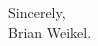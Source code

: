 \begin{comment}
\vspace{2.0ex}

I would enjoy discussing this position with you in the weeks to come. In the meantime, I am enclosing my curriculum vitae and list of courses taught.  If you require any additional materials or information, I am happy to supply it. Thank you very much for your consideration. \\

\end{comment}

\vspace{4.0ex}

Sincerely, \\
\vspace{2.0ex}
Brian Weikel.
